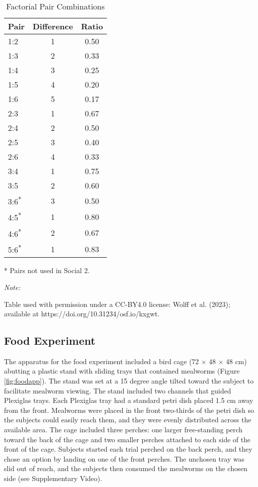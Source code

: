 \documentclass[
  ,pub,floatsintext]{apa6}
\begin{document}
\begin{table}[!h]

\caption{\label{tab:pairstablelatex}Factorial Pair Combinations}
\centering
\begin{threeparttable}
\begin{tabular}[t]{lcc}
\toprule
Pair & Difference & Ratio\\
\midrule
1:2 & 1 & 0.50\\
1:3 & 2 & 0.33\\
1:4 & 3 & 0.25\\
1:5 & 4 & 0.20\\
1:6 & 5 & 0.17\\
2:3 & 1 & 0.67\\
2:4 & 2 & 0.50\\
2:5 & 3 & 0.40\\
2:6 & 4 & 0.33\\
3:4 & 1 & 0.75\\
3:5 & 2 & 0.60\\
3:6\textsuperscript{*} & 3 & 0.50\\
4:5\textsuperscript{*} & 1 & 0.80\\
4:6\textsuperscript{*} & 2 & 0.67\\
5:6\textsuperscript{*} & 1 & 0.83\\
\bottomrule
\end{tabular}
\begin{tablenotes}
\item[*] Pairs not used in Social 2.
\item \textit{Note: } 
\item Table used with permission under a CC-BY4.0 license: Wolff et al. (2023); available at https://doi.org/10.31234/osf.io/kxgwt.
\end{tablenotes}
\end{threeparttable}
\end{table}

\hypertarget{food-experiment}{%
\subsection{Food Experiment}\label{food-experiment}}

The apparatus for the food experiment included a bird cage (72 \(\times\) 48 \(\times\) 48 cm) abutting a plastic stand with sliding trays that contained mealworms (Figure \ref{fig:foodapp}). The stand was set at a 15 degree angle tilted toward the subject to facilitate mealworm viewing. The stand included two channels that guided Plexiglas trays. Each Plexiglas tray had a standard petri dish placed 1.5 cm away from the front. Mealworms were placed in the front two-thirds of the petri dish so the subjects could easily reach them, and they were evenly distributed across the available area. The cage included three perches: one larger free-standing perch toward the back of the cage and two smaller perches attached to each side of the front of the cage. Subjects started each trial perched on the back perch, and they chose an option by landing on one of the front perches. The unchosen tray was slid out of reach, and the subjects then consumed the mealworms on the chosen side (see Supplementary Video).
\end{document}
